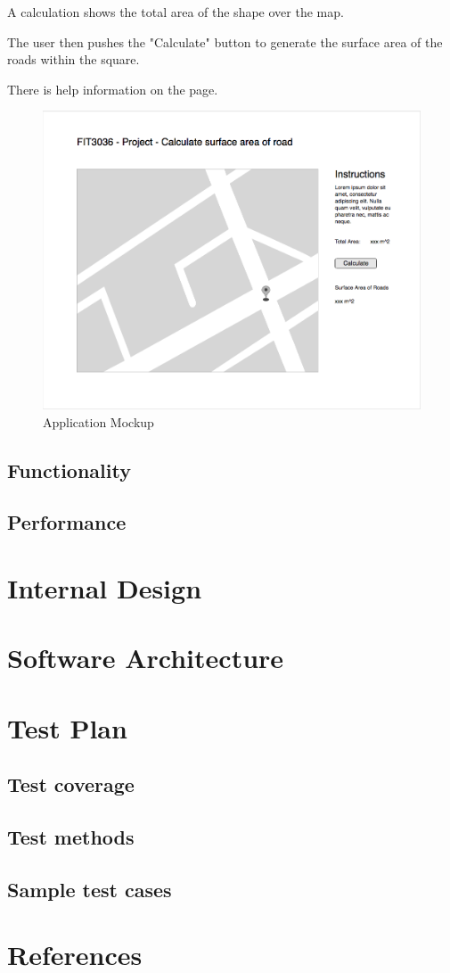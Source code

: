 \documentclass[a4paper,11pt]{article}
\begin{document}
A calculation shows the total area of the shape over the map.

The user then pushes the "Calculate" button to generate the surface area of the roads within the square.

There is help information on the page.

\begin{figure}[H]
	\includegraphics[width=\textwidth]{UI-mockup}
	\caption{Application Mockup}
	\label{fig:mockup}
\end{figure}

\subsection{Functionality}

\subsection{Performance}

\section{Internal Design}

\section{Software Architecture}

\section{Test Plan}

\subsection{Test coverage}

\subsection{Test methods}

\subsection{Sample test cases}

\section{References}
\end{document}
